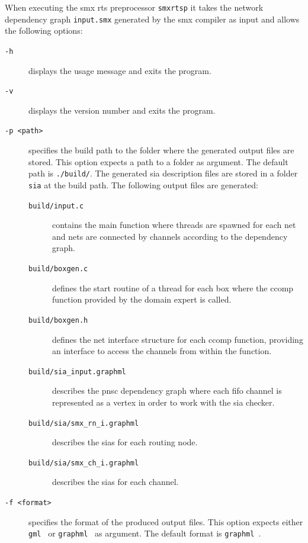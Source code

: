When executing the \gls*{smx} \gls{rts} preprocessor \texttt{smxrtsp} it takes the network dependency graph \texttt{input.smx} generated by the \gls*{smx} compiler as input and allows the following options:
\begin{description}
    \item[\texttt{-h}] displays the usage message and exits the program.
    \item[\texttt{-v}] displays the version number and exits the program.
    \item[\texttt{-p <path>}] specifies the build path to the folder where the generated output files are stored.
        This option expects a path to a folder as argument.
        The default path is \texttt{./build/}.
        The generated \gls{sia} description files are stored in a folder \texttt{sia} at the build path.
        The following output files are generated:
        \begin{description}
            \item[\texttt{build/input.c}] contains the main function where threads are spawned for each net and nets are connected by channels according to the dependency graph.
            \item[\texttt{build/boxgen.c}] defines the start routine of a thread for each box where the \gls*{ccomp} function provided by the domain expert is called.
            \item[\texttt{build/boxgen.h}] defines the net interface structure for each \gls*{ccomp} function, providing an interface to access the channels from within the function.
            \item[\texttt{build/sia\_input.graphml}] describes the \gls{pnsc} dependency graph where each \gls{fifo} channel is represented as a vertex in order to work with the \gls{sia} checker.
            \item[\texttt{build/sia/smx\_rn\_i.graphml}] describes the \glspl{sia} for each routing node.
            \item[\texttt{build/sia/smx\_ch\_i.graphml}] describes the \glspl{sia} for each channel.
        \end{description}
    \item[\texttt{-f <format>}] specifies the format of the produced output files.
        This option expects either \texttt{gml}~\cite{himsolt1996} or \texttt{graphml}~\cite{brandes2001} as argument.
        The default format is \texttt{graphml}~\cite{brandes2001}.
\end{description}


